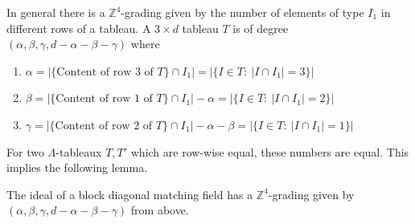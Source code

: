 \documentclass[ALCO,ThmDefs,Unicode,epreuves]{cedram}
\begin{document}
 
 In general there is a $\mathbb{Z}^4$-grading given by the number of elements of type $I_1$ in different rows of a tableau. A $3\times d$ tableau $T$ is of degree $(\alpha, \beta,\gamma, d-\alpha-\beta-\gamma)$ 
 where 
\begin{enumerate}
\item $\alpha=|\{\text{Content of row 3 of } T\}\cap I_1| = |\{I\in T: \ |I \cap I_1| = 3\}|$ 
\item $\beta=|\{\text{Content of row 1 of } T\}\cap I_1|-\alpha = |\{I\in T: \ |I \cap I_1| = 2\}|$ 
\item $\gamma=|\{\text{Content of row 2 of } T\}\cap I_1|-\alpha-\beta = |\{I\in T: \ |I \cap I_1| = 1\}|$ 
\end{enumerate}
For two $\Lambda$-tableaux $T,T'$ which are row-wise equal, these numbers are equal. This implies the following lemma.
 
 
\begin{lemm}\label{lem:homo}
The ideal of a block diagonal matching field
has a $\mathbb{Z}^4$-grading given by $(\alpha, \beta,\gamma, d-\alpha-\beta-\gamma)$
from above. 
 \end{lemm}
 
 
 
\end{document}
